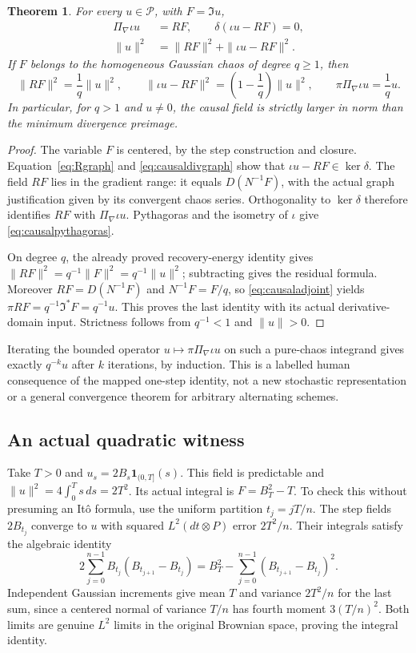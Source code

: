 \documentclass[11pt]{article}
\newtheorem{theorem}{Theorem}[section]
\begin{document}
\begin{theorem}\label{thm:causalminimum}
For every $u\in\mathcal P$, with $F=\mathfrak Iu$,
\begin{align}
 \Pi_\nabla\iota u&=RF,\qquad
          \delta(\iota u-RF)=0,\label{eq:causalminimum}\\
 \|u\|^2&=\|RF\|^2+\|\iota u-RF\|^2.\label{eq:causalpythagoras}
\end{align}
If $F$ belongs to the homogeneous Gaussian chaos of degree $q\geq1$,
then
\begin{equation}\label{eq:causalsector}
 \|RF\|^2=\frac1q\|u\|^2,\qquad
 \|\iota u-RF\|^2=\left(1-\frac1q\right)\|u\|^2,
 \qquad\pi\Pi_\nabla\iota u=\frac1q u.
\end{equation}
In particular, for $q>1$ and $u\ne0$, the causal field is strictly
larger in norm than the minimum divergence preimage.
\end{theorem}
\begin{proof}
The variable $F$ is centered, by the step construction and closure.
Equation~\eqref{eq:Rgraph} and \eqref{eq:causaldivgraph} show that
$\iota u-RF\in\ker\delta$. The field $RF$ lies in the gradient
range: it equals $D(N^{-1}F)$, with the actual graph justification
given by its convergent chaos series. Orthogonality to $\ker\delta$
therefore identifies $RF$ with $\Pi_\nabla\iota u$. Pythagoras
and the isometry of $\iota$ give \eqref{eq:causalpythagoras}.

On degree $q$, the already proved recovery-energy identity gives
$\|RF\|^2=q^{-1}\|F\|^2=q^{-1}\|u\|^2$; subtracting gives the
residual formula. Moreover $RF=D(N^{-1}F)$ and $N^{-1}F=F/q$,
so \eqref{eq:causaladjoint} yields
$\pi RF=q^{-1}\mathfrak I^*F=q^{-1}u$. This proves the last
identity with its actual derivative-domain input. Strictness follows
from $q^{-1}<1$ and $\|u\|>0$.
\end{proof}
Iterating the bounded operator $u\mapsto\pi\Pi_\nabla\iota u$
on such a pure-chaos integrand gives exactly $q^{-k}u$ after $k$
iterations, by induction. This is a labelled human consequence of
the mapped one-step identity, not a new stochastic representation
or a general convergence theorem for arbitrary alternating schemes.

\subsection*{An actual quadratic witness}
Take $T>0$ and $u_s=2B_s\mathbf1_{(0,T]}(s)$. This field is
predictable and $\|u\|^2=4\int_0^T s\,ds=2T^2$.
Its actual integral is $F=B_T^2-T$. To check this without presuming
an It\^o formula, use the uniform partition $t_j=jT/n$. The step
fields $2B_{t_j}$ converge to $u$ with squared $L^2(dt\otimes P)$
error $2T^2/n$. Their integrals satisfy the algebraic identity
\[
 2\sum_{j=0}^{n-1}B_{t_j}(B_{t_{j+1}}-B_{t_j})
       =B_T^2-\sum_{j=0}^{n-1}(B_{t_{j+1}}-B_{t_j})^2.
\]
Independent Gaussian increments give mean $T$ and variance
$2T^2/n$ for the last sum, since a centered normal of variance
$T/n$ has fourth moment $3(T/n)^2$. Both limits are genuine $L^2$
limits in the original Brownian space, proving the integral identity.
\end{document}
